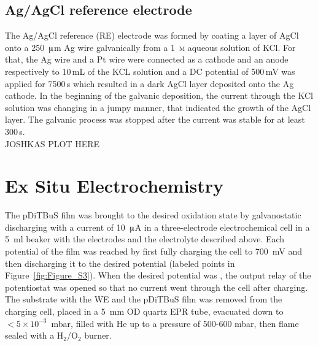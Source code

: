 \subsection{Ag/AgCl reference electrode}\label{Ref_electrode}
The Ag/AgCl reference (RE) electrode was formed by coating a layer of AgCl onto a 250~$\muup$m Ag wire galvanically from a 1~\textsc{m} aqueous solution of KCl. For that, the Ag wire and a Pt wire were connected as a cathode and an anode respectively to 10$\,$mL of the KCL solution and a DC potential of 500$\,$mV was applied for 7500$\,$s which resulted in a dark AgCl layer deposited onto the Ag cathode. In the beginning of the galvanic deposition, the current through the KCl solution was changing in a jumpy manner, that indicated the growth of the AgCl layer. The galvanic process was stopped after the current was stable for at least 300$\,$s.\\
JOSHKAS PLOT HERE\\


\section{Ex Situ Electrochemistry}
\label{sample_fab_2}
The pDiTBuS film was brought to the desired oxidation state by galvanostatic discharging with a current of 10~$\muup$A in a three-electrode electrochemical cell in a 5~ml beaker with the electrodes and the electrolyte described above.
Each potential of the film was reached by first fully charging the cell to 700~mV and then discharging it to the desired potential (labeled points in Figure~\ref{fig:Figure_S3}). When the desired potential was , the output relay of the potentiostat was opened so that no current went through the cell after charging. The substrate with the WE and the pDiTBuS film was removed from the charging cell, placed in a 5~mm OD quartz EPR tube, evacuated down to $<5\times10^{-3}$~mbar, filled with He up to a pressure of 500-600 mbar, then flame sealed with a H$_2$/O$_2$ burner.

